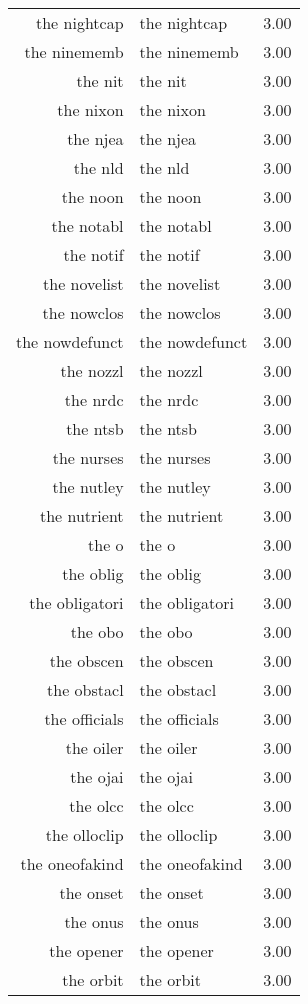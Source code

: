 \begin{table}[ht]
\begin{tabular}{rlr}
  the nightcap & the nightcap & 3.00 \\ 
  the ninememb & the ninememb & 3.00 \\ 
  the nit & the nit & 3.00 \\ 
  the nixon & the nixon & 3.00 \\ 
  the njea & the njea & 3.00 \\ 
  the nld & the nld & 3.00 \\ 
  the noon & the noon & 3.00 \\ 
  the notabl & the notabl & 3.00 \\ 
  the notif & the notif & 3.00 \\ 
  the novelist & the novelist & 3.00 \\ 
  the nowclos & the nowclos & 3.00 \\ 
  the nowdefunct & the nowdefunct & 3.00 \\ 
  the nozzl & the nozzl & 3.00 \\ 
  the nrdc & the nrdc & 3.00 \\ 
  the ntsb & the ntsb & 3.00 \\ 
  the nurses & the nurses & 3.00 \\ 
  the nutley & the nutley & 3.00 \\ 
  the nutrient & the nutrient & 3.00 \\ 
  the o & the o & 3.00 \\ 
  the oblig & the oblig & 3.00 \\ 
  the obligatori & the obligatori & 3.00 \\ 
  the obo & the obo & 3.00 \\ 
  the obscen & the obscen & 3.00 \\ 
  the obstacl & the obstacl & 3.00 \\ 
  the officials & the officials & 3.00 \\ 
  the oiler & the oiler & 3.00 \\ 
  the ojai & the ojai & 3.00 \\ 
  the olcc & the olcc & 3.00 \\ 
  the olloclip & the olloclip & 3.00 \\ 
  the oneofakind & the oneofakind & 3.00 \\ 
  the onset & the onset & 3.00 \\ 
  the onus & the onus & 3.00 \\ 
  the opener & the opener & 3.00 \\ 
  the orbit & the orbit & 3.00 \\ 

\end{tabular}
\end{table}
